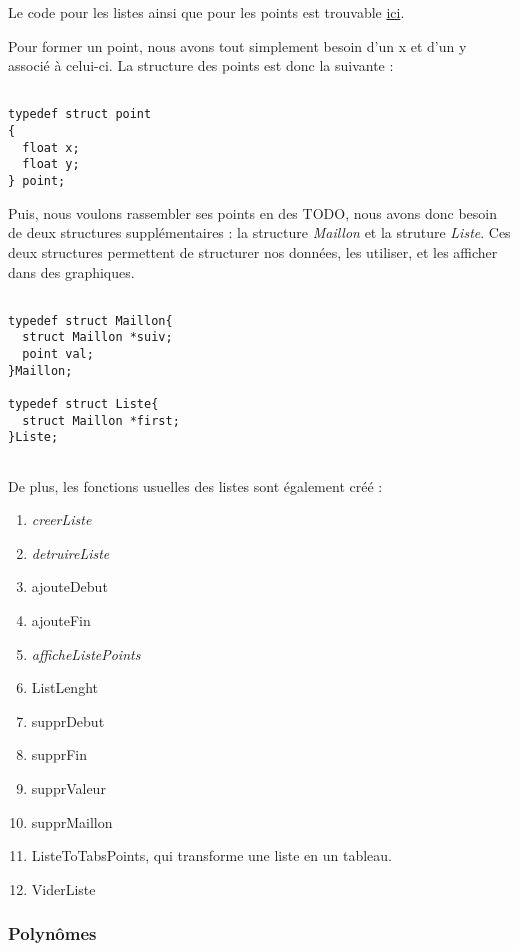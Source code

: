 \documentclass[letter]{article}
\begin{document}
Le code pour les listes ainsi que pour les points est trouvable \href{listePoint.c}{ici}.

Pour former un point, nous avons tout simplement besoin d'un x et d'un y associé à celui-ci.
La structure des points est donc la suivante :

\begin{verbatim}

typedef struct point
{
  float x;
  float y;
} point;

\end{verbatim}

Puis, nous voulons rassembler ses points en des TODO, nous avons donc besoin de deux structures supplémentaires : la structure \emph{Maillon} et la struture \emph{Liste}. Ces deux structures permettent de structurer nos données, les utiliser, et les afficher dans des graphiques.

\begin{verbatim}

typedef struct Maillon{
  struct Maillon *suiv;
  point val;
}Maillon;

typedef struct Liste{
  struct Maillon *first;
}Liste;


\end{verbatim}

De plus, les fonctions usuelles des listes sont également créé :
\begin{enumerate}
\item \emph{creerListe}
\item \emph{detruireListe}
\item ajouteDebut
\item ajouteFin
\item \emph{afficheListePoints}
\item ListLenght
\item supprDebut
\item supprFin
\item supprValeur
\item supprMaillon
\item ListeToTabsPoints, qui transforme une liste en un tableau.
\item ViderListe
\end{enumerate}



\subsubsection{Polynômes}
\label{sec:org9434df4}
\end{document}
